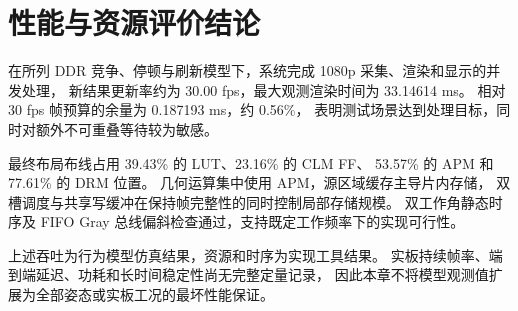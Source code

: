 \section{性能与资源评价结论}
在所列 DDR 竞争、停顿与刷新模型下，系统完成 1080p 采集、渲染和显示的并发处理，
新结果更新率约为 30.00 fps，最大观测渲染时间为 33.14614 ms。
相对 30 fps 帧预算的余量为 0.187193 ms，约 0.56\%，
表明测试场景达到处理目标，同时对额外不可重叠等待较为敏感。

最终布局布线占用 39.43\% 的 LUT、23.16\% 的 CLM FF、
53.57\% 的 APM 和 77.61\% 的 DRM 位置。
几何运算集中使用 APM，源区域缓存主导片内存储，
双槽调度与共享写缓冲在保持帧完整性的同时控制局部存储规模。
双工作角静态时序及 FIFO Gray 总线偏斜检查通过，支持既定工作频率下的实现可行性。

上述吞吐为行为模型仿真结果，资源和时序为实现工具结果。
实板持续帧率、端到端延迟、功耗和长时间稳定性尚无完整定量记录，
因此本章不将模型观测值扩展为全部姿态或实板工况的最坏性能保证。
